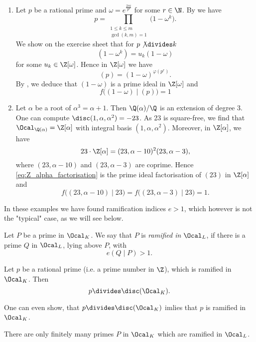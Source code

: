 \begin{exmp*}
	\begin{enumerate}[label=(\alph*)]
		\item Let \( p \) be a rational prime and \( \omega = e^{\frac{2\pi i}{p^r}} \) for some \( r \in \N \).
			By  we have
			\[ p = \prod_{\substack{1 \leq k \leq m\\\gcd(k,m)=1}} \big( 1-\omega^k \big). \]
			We show on the exercise sheet that for \( p \not\divides k \)
			\[ (1-\omega^k) = u_k (1-\omega) \]
			for some \( u_k \in \Z[\omega] \).
			Hence in \( \Z[\omega] \) we have
			\[ (p) = (1-\omega)^{\varphi(p^r)}. \]
			By , we deduce that \( (1-\omega) \) is a prime ideal in \( \Z[\omega] \) and
			\[ f\big( (1-\omega) \mid (p) \big) = 1 \]
			
		\item Let \( \alpha \) be a root of \( \alpha^3 = \alpha + 1 \).
			Then \( \Q(\alpha) / \Q \) is an extension of degree 3.
			One can compute \( \disc(1, \alpha, \alpha^2) = -23 \).
			As 23 is square-free, we find that \( \Ocal_{\Q(\alpha)} = \Z[\alpha] \) with integral basis \( (1, \alpha, \alpha^2) \).
			Moreover, in \( \Z[\alpha] \), we have
			\begin{equation}\label{eq:Z_alpha_factorisation}
				23 \cdot \Z[\alpha] = (23, \alpha-10)^2 (23, \alpha-3),
			\end{equation}
			where \( (23, \alpha-10) \) and \( (23, \alpha-3) \) are coprime.
			Hence \eqref{eq:Z_alpha_factorisation} is the prime ideal factorisation of \( (23) \) in \( \Z[\alpha] \) and
			\[ f\big( (23, \alpha-10) \mid 23 \big) = f\big( (23, \alpha-3) \mid 23 \big) = 1. \]
	\end{enumerate}
\end{exmp*}

\begin{rem*}
	In these examples we have found ramification indices \( e>1 \), which however is not the "typical" case, as we will see below.
\end{rem*}

\begin{defn*}
	Let \( P \) be a prime in \( \Ocal_K \).
	We say that \( P \) is \emph{ramified in} \( \Ocal_L \), if there is a prime \( Q \) in \( \Ocal_L \), lying above \( P \), with
	\[ e(Q \mid P) > 1. \]
\end{defn*}

\begin{thmn}
	Let \( p \) be a rational prime (i.e. a prime number in \( \Z \)), which is ramified in \( \Ocal_K \).
	Then
	\[ p \divides \disc(\Ocal_K). \]
\end{thmn}

\begin{rem*}
	One can even show, that \( p \divides \disc(\Ocal_K) \) imlies that \( p \) is ramified in \( \Ocal_K \).
\end{rem*}

\begin{cor}
	There are only finitely many primes \( P \) in \( \Ocal_K \) which are ramified in \( \Ocal_L \).
\end{cor}